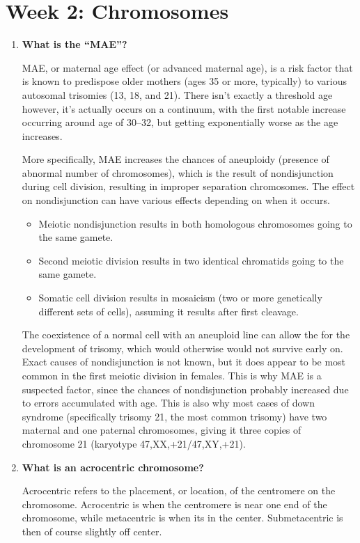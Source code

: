 \documentclass[basic]{inVerba-notes}
\begin{document}
  \section{Week 2: Chromosomes}
  \begin{enumerate}
    \item \textbf{What is the ``MAE''?}
    
    MAE, or maternal age effect (or advanced maternal age), is a risk factor that is known to predispose older mothers (ages 35 or more, typically) to various autosomal trisomies (13, 18, and 21). There isn't exactly a threshold age however, it's actually occurs on a continuum, with the first notable increase occurring around age of 30--32, but getting exponentially worse as the age increases.

    More specifically, MAE increases the chances of aneuploidy (presence of abnormal number of chromosomes), which is the result of nondisjunction during cell division, resulting in improper separation chromosomes. The effect on nondisjunction can have various effects depending on when it occurs. 
      \begin{itemize}
        \item Meiotic nondisjunction results in both homologous chromosomes going to the same gamete.
        \item Second meiotic division results in two identical chromatids going to the same gamete.
        \item Somatic cell division results in mosaicism (two or more genetically different sets of cells), assuming it results after first cleavage.
      \end{itemize}

    The coexistence of a normal cell with an aneuploid line can allow the for the development of trisomy, which would otherwise would not survive early on. Exact causes of nondisjunction is not known, but it does appear to be most common in the first meiotic division in females. This is why MAE is a suspected factor, since the chances of nondisjunction probably increased due to errors accumulated with age. This is also why most cases of down syndrome (specifically trisomy 21, the most common trisomy) have two maternal and one paternal chromosomes, giving it three copies of chromosome 21 (karyotype 47,XX,+21/47,XY,+21).

    \item \textbf{What is an acrocentric chromosome?}
    
    Acrocentric refers to the placement, or location, of the centromere on the chromosome. Acrocentric is when the centromere is near one end of the chromosome, while metacentric is when its in the center. Submetacentric is then of course slightly off center.


\end{enumerate}
\end{document}
